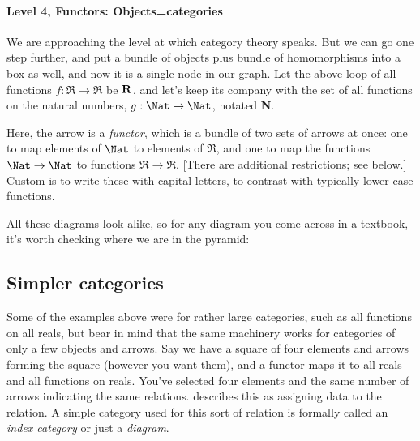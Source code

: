 \documentclass[11pt]{article}
\begin{document}
\paragraph{Level 4, Functors: Objects=categories}
We are approaching the level at which category theory speaks. But we can go one step
further, and put a bundle of objects plus bundle of homomorphisms into a box as well, and
now it is a single node in our graph. Let the above loop of all functions $f:\Re\to\Re$
be $\bf R$, and let's keep its company with the set of all functions on the natural
numbers, $g:\Nat\to\Nat$, notated {\bf N}.


Here, the arrow is a {\em functor}, which is a bundle of two sets of arrows at once:
one to map elements of $\Nat$ to elements of $\Re$, and one to map the functions
$\Nat\to \Nat$ to functions $\Re\to \Re$. [There are additional restrictions; see
below.] Custom is to write these with capital letters, to contrast with typically
lower-case functions.

All these diagrams look alike, so for any diagram you come across in a textbook, it's
worth checking where we are in the pyramid:

\subsection{Simpler categories}
Some of the examples above were for rather large categories, such as all functions on all
reals, but bear in mind that the same machinery works for categories of only a few objects
and arrows. Say we have a square of four elements and arrows forming the square (however
you want them), and a functor maps it to all reals and all functions on reals. You've
selected four elements and the same number of arrows indicating the same relations.
\citet{leinster:basic} describes this as assigning data to the relation. A simple category
used for this sort of relation is formally called an {\em index category} or just a {\em diagram}. \label{diagramref}
\end{document}

